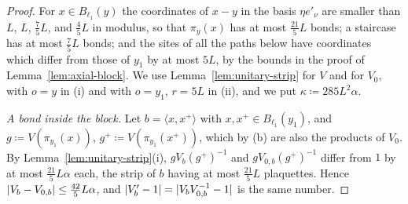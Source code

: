 \documentclass[11pt]{preprint}
\DeclarePairedDelimiter{\abs}{\lvert}{\rvert}
\numberwithin{equation}{section}
\theoremstyle{definition}
\theoremstyle{remark}
\theoremstyle{plain}
\begin{document}
\begin{proof}
For $x \in B_{\ell_1}(y)$ the coordinates of $x - y$ in the basis $\eta e'_\nu$ are smaller than $L$, $L$, $\frac75L$, and $\frac45L$ in modulus, so that $\pi_y(x)$ has at most $\frac{21}{5}L$ bonds; a staircase has at most $\frac75L$ bonds; and the sites of all the paths below have coordinates which differ from those of $y_1$ by at most $5L$, by the bounds in the proof of Lemma~\ref{lem:axial-block}. We use Lemma~\ref{lem:unitary-strip} for $V$ and for $V_0$, with $o = y$ in (i) and with $o = y_1$, $r = 5L$ in (ii), and we put $\kappa \coloneqq 285L^2\alpha$.

\emph{A bond inside the block.} Let $b = \langle x, x^+\rangle$ with $x, x^+ \in B_{\ell_1}(y_1)$, and $g \coloneqq V(\pi_{y_1}(x))$, $g^+ \coloneqq V(\pi_{y_1}(x^+))$, which by (b) are also the products of $V_0$. By Lemma~\ref{lem:unitary-strip}(i), $gV_b(g^+)^{-1}$ and $gV_{0,b}(g^+)^{-1}$ differ from $1$ by at most $\frac{21}{5}L\alpha$ each, the strip of $b$ having at most $\frac{21}{5}L$ plaquettes. Hence $\abs{V_b - V_{0,b}} \leq \frac{42}{5}L\alpha$, and $\abs{V'_b - 1} = \abs{V_bV_{0,b}^{-1} - 1}$ is the same number.


\end{proof}
\end{document}

